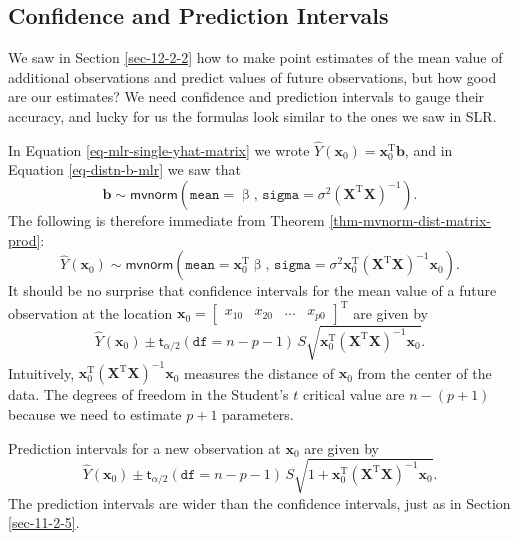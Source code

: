 \documentclass[captions=tableheading]{scrbook}
\begin{document}
\subsection{Confidence and Prediction Intervals}
\label{sec-12-2-5}


We saw in Section \ref{sec-12-2-2} how to make point estimates of the mean value of additional observations and predict values of future observations, but how good are our estimates? We need confidence and prediction intervals to gauge their accuracy, and lucky for us the formulas look similar to the ones we saw in SLR.

In Equation \ref{eq-mlr-single-yhat-matrix} we wrote \( \hat{Y}(\mathbf{x}_{0})=\mathbf{x}_{0}^{\mathrm{T}}\mathbf{b} \), and in Equation \ref{eq-distn-b-mlr} we saw that
\begin{equation}
\mathbf{b}\sim\mathsf{mvnorm}\left(\mathtt{mean}=\upbeta,\,\mathtt{sigma}=\sigma^{2}\left(\mathbf{X}^{\mathrm{T}}\mathbf{X}\right)^{-1}\right).
\end{equation}
The following is therefore immediate from Theorem \ref{thm-mvnorm-dist-matrix-prod}:
\begin{equation}
\hat{Y}(\mathbf{x}_{0})\sim\mathsf{mvnorm}\left(\mathtt{mean}=\mathbf{x}_{0}^{\mathrm{T}}\upbeta,\,\mathtt{sigma}=\sigma^{2}\mathbf{x}_{0}^{\mathrm{T}}\left(\mathbf{X}^{\mathrm{T}}\mathbf{X}\right)^{-1}\mathbf{x}_{0}\right).
\end{equation}
It should be no surprise that confidence intervals for the mean value of a future observation at the location \(\mathbf{x}_{0}=\begin{bmatrix}x_{10} & x_{20} & \ldots & x_{p0}\end{bmatrix}^{\mathrm{T}}\) are given by
\begin{equation}
\hat{Y}(\mathbf{x}_{0})\pm\mathsf{t}_{\alpha/2}(\mathtt{df}=n-p-1)\, S\sqrt{\mathbf{x}_{0}^{\mathrm{T}}\left(\mathbf{X}^{\mathrm{T}}\mathbf{X}\right)^{-1}\mathbf{x}_{0}}.
\end{equation}
Intuitively, \(\mathbf{x}_{0}^{\mathrm{T}}\left(\mathbf{X}^{\mathrm{T}}\mathbf{X}\right)^{-1}\mathbf{x}_{0}\) measures the distance of \(\mathbf{x}_{0}\) from the center of the data. The degrees of freedom in the Student's \(t\) critical value are \(n-(p+1)\) because we need to estimate \(p+1\) parameters.

Prediction intervals for a new observation at \(\mathbf{x}_{0}\) are given by
\begin{equation}
\hat{Y}(\mathbf{x}_{0})\pm\mathsf{t}_{\alpha/2}(\mathtt{df}=n-p-1)\, S\sqrt{1+\mathbf{x}_{0}^{\mathrm{T}}\left(\mathbf{X}^{\mathrm{T}}\mathbf{X}\right)^{-1}\mathbf{x}_{0}}.
\end{equation}
The prediction intervals are wider than the confidence intervals, just as in Section \ref{sec-11-2-5}.
\end{document}
